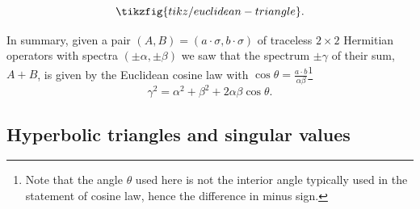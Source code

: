 \documentclass[notitlepage, 10pt]{article}
\begin{document}
\begin{equation}
    \tikzfig{tikz/euclidean-triangle}.
\end{equation}

In summary, given a pair $(A,B) = (a\cdot \sigma, b\cdot \sigma)$ of traceless $2\times 2$ Hermitian operators with spectra $(\pm \alpha, \pm \beta)$ we saw that the spectrum $\pm \gamma$ of their sum, $A+B$, is given by the Euclidean cosine law with $\cos \theta = \frac{a \cdot b}{\alpha \beta}$\footnote{Note that the angle $\theta$ used here is not the interior angle typically used in the statement of cosine law, hence the difference in minus sign.}
\begin{equation}
    \gamma^2 = \alpha^2 + \beta^2 + 2 \alpha \beta \cos \theta.
\end{equation}

\subsection{Hyperbolic triangles and singular values}
\end{document}
